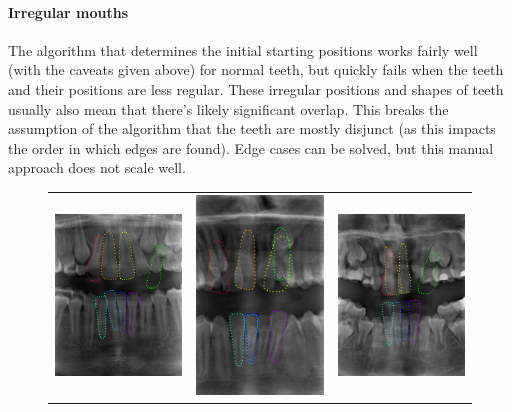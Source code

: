 \documentclass[a4paper,10pt]{article}
\begin{document}
\paragraph{Irregular mouths} The algorithm that determines the initial starting positions works fairly well (with the caveats given above) for normal teeth, but quickly fails when the teeth and their positions are less regular. These irregular positions and shapes of teeth usually also mean that there's likely significant overlap. This breaks the assumption of the algorithm that the teeth are mostly disjunct (as this impacts the order in which edges are found). Edge cases can be solved, but this manual approach does not scale well.

\begin{figure}[!h]
\begin{tabular}{ccc}
\includegraphics[width=50mm]{tooth_result_13.png} & \includegraphics[width=50mm]{tooth_result_22.png} & \includegraphics[width=50mm]{tooth_result_16.png}\\
 

\end{tabular}
\end{figure}
\end{document}
